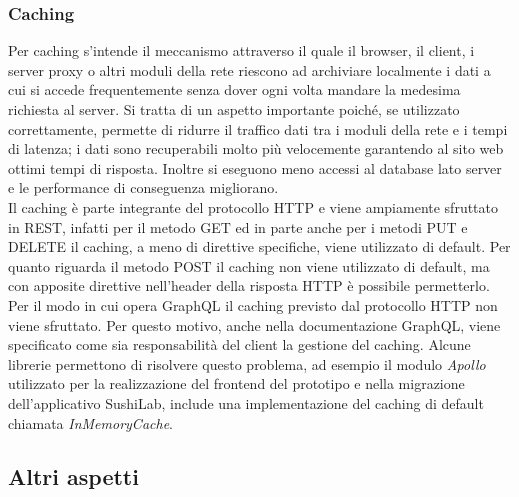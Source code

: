 \subsubsection*{Caching}
Per caching s'intende il meccanismo attraverso il quale il browser, il client, i server proxy o altri moduli della rete riescono ad archiviare localmente i dati a cui si accede frequentemente senza dover ogni volta mandare la medesima richiesta al server. Si tratta di un aspetto importante poiché, se utilizzato correttamente, permette di ridurre il traffico dati tra i moduli della rete e i tempi di latenza; i dati sono recuperabili molto più velocemente garantendo al sito web ottimi tempi di risposta. Inoltre si eseguono meno accessi al database lato server e le performance di conseguenza migliorano.\\
Il caching è parte integrante del protocollo HTTP e viene ampiamente sfruttato in REST, infatti per il metodo GET ed in parte anche per i metodi PUT e DELETE il caching, a meno di direttive specifiche, viene utilizzato di default. Per quanto riguarda il metodo POST il caching non viene utilizzato di default, ma con apposite direttive nell'header della risposta HTTP è possibile permetterlo.\\
Per il modo in cui opera GraphQL il caching previsto dal protocollo HTTP non viene sfruttato. Per questo motivo, anche nella documentazione GraphQL, viene specificato come sia responsabilità del client la gestione del caching. Alcune librerie permettono di risolvere questo problema, ad esempio il modulo \textit{Apollo} utilizzato per la realizzazione del frontend del prototipo e nella migrazione dell'applicativo SushiLab, include una implementazione del caching di default chiamata \textit{InMemoryCache}.
\subsection{Altri aspetti}
